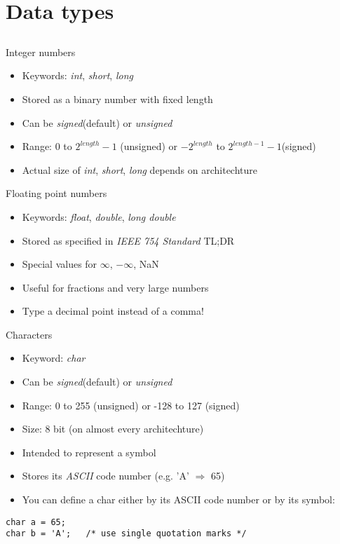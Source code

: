 \section{Data types}
\subsection{}
\begin{frame}{Integer numbers}
	\begin{itemize}
		\item Keywords: \textit{int}, \textit{short}, \textit{long}
		\item Stored as a binary number with fixed length
		\item Can be \textit{signed}(default) or \textit{unsigned} 
		\item Range: 0 to $2^{length}-1$ (unsigned) or $-2^{length}$ to $2^{length-1}-1$(signed)
		\item Actual size of \textit{int}, \textit{short}, \textit{long} depends on architechture
	\end{itemize}
\end{frame}
\begin{frame}{Floating point numbers}
	\begin{itemize}
		\item Keywords: \textit{float}, \textit{double}, \textit{long double}
		\item Stored as specified in \textit{IEEE 754 Standard} TL;DR
		\item Special values for $\infty$, $-\infty$, NaN
		\item Useful for fractions and very large numbers
		\item Type a decimal point instead of a comma!
	\end{itemize}
\end{frame}
\begin{frame}[fragile]{Characters}
	\begin{itemize}
		\item Keyword: \textit{char}
		\item Can be \textit{signed}(default) or \textit{unsigned}
		\item Range: 0 to 255 (unsigned) or -128 to 127 (signed)	
		\item Size: 8 bit (on almost every architechture)
		\item Intended to represent a symbol
		\item Stores its \textit{ASCII} code number (e.g. 'A' $\Rightarrow$ 65)
		\item You can define a char either by its ASCII code number or by its symbol:
	\end{itemize}
	\begin{lstlisting}[numbers=none]
char a = 65;
char b = 'A';	/* use single quotation marks */
\end{lstlisting}
\end{frame}
